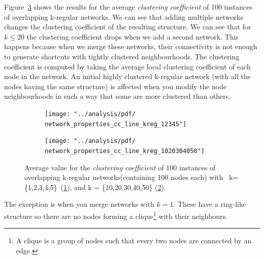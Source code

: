 \documentclass[preprint,number]{elsarticle}
\begin{document}
\noindent Figure~\ref{fig:network_properties_cc_line_kreg} shows the results for the average \textit{clustering coefficient} of 100 instances of overlapping k-regular networks. We can see that adding multiple networks changes the clustering coefficient of the resulting structure. We can see that for $k \le 20$ the clustering coefficient drops when we add a second network. This happens because when we merge these networks, their connectivity is not enough to generate shortcuts with tightly clustered neighbourhoods. The clustering coefficient is computed by taking the average local clustering coefficient of each node in the network. An initial highly clustered k-regular network (with all the nodes having the same structure) is affected when you modify the node neighbourhoods in such a way that some are more clustered than others.

\begin{figure}[H]
	\centering
	\begin{subfigure}{.5\linewidth}
		\centering
		\texttt{[image: "../analysis/pdf/ network\_properties\_cc\_line\_kreg\_12345"]}
		\caption{}
		\label{fig:network_properties_cc_line_kreg_12345}
	\end{subfigure}%
	\begin{subfigure}{.5\linewidth}
		\centering
		\texttt{[image: "../analysis/pdf/ network\_properties\_cc\_line\_kreg\_1020304050"]}
		\caption{}
		\label{fig:network_properties_cc_line_kreg_1020304050}
	\end{subfigure}
	\begin{minipage}{0.9\textwidth}
		\vspace{0.2cm}
		\caption{Average value for the \textit{clustering coefficient} of 100 instances of overlapping k-regular networks(containing 100 nodes each) with ~k=\{1,2,3,4,5\}~(\ref{fig:network_properties_cc_line_kreg_12345}), and  k = \{10,20,30,40,50\} (\ref{fig:network_properties_cc_line_kreg_1020304050}).}
		\label{fig:network_properties_cc_line_kreg}
	\end{minipage}
\end{figure}

The exception is when you merge networks with $k=1$. These have a ring-like structure so there are no nodes forming a clique\footnote{A clique is a group of nodes such that every two nodes are connected by an edge.} with their neighbours. 
\end{document}
